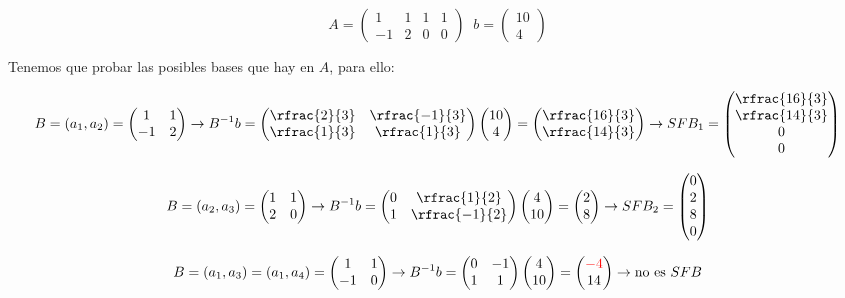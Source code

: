 \begin{problem}[14]
\[
	A = \begin{pmatrix} 1&1&1&1\\-1&2&0&0\end{pmatrix}\;\; b = \begin{pmatrix}10\\4\end{pmatrix}
\]

Tenemos que probar las posibles bases que hay en $A$, para ello:

\[
	B = (a_1,a_2) = \begin{pmatrix}1&1\\-1&2\end{pmatrix} \to B^{-1}b = \begin{pmatrix}\rfrac{2}{3}&\rfrac{-1}{3}\\\rfrac{1}{3}&\rfrac{1}{3}\end{pmatrix} \begin{pmatrix}10\\4\end{pmatrix} = \begin{pmatrix}\rfrac{16}{3}\\\rfrac{14}{3}\end{pmatrix} \to SFB_1 = \begin{pmatrix}\rfrac{16}{3}\\\rfrac{14}{3}\\0\\0\end{pmatrix}
\]


\[
	B = (a_2,a_3)  = \begin{pmatrix}1&1\\2&0\end{pmatrix} \to B^{-1}b = \begin{pmatrix}0&\rfrac{1}{2}\\1&\rfrac{-1}{2}\end{pmatrix}\begin{pmatrix}4\\10\end{pmatrix} = \begin{pmatrix} 2\\8\end{pmatrix} \to SFB_2 = \begin{pmatrix} 0\\2\\8\\0\end{pmatrix}
\]

\[
	B = (a_1,a_3) = (a_1,a_4) = \begin{pmatrix} 1&1\\-1&0\end{pmatrix} \to B^{-1}b = \begin{pmatrix}0&-1\\1&1\end{pmatrix}\begin{pmatrix}4\\10\end{pmatrix} = \begin{pmatrix}\textcolor{red}{-4}\\14\end{pmatrix} \to \text{no es } SFB
\]


\end{problem}
